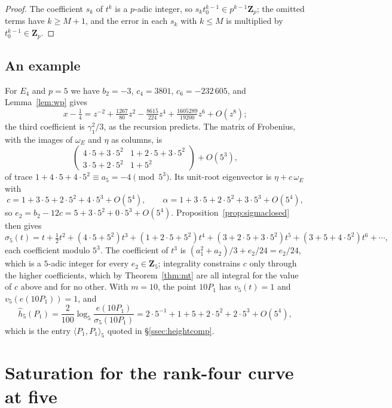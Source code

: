 \documentclass[11pt]{amsart}
\theoremstyle{definition}
\newcommand{\Z}{\mathbf{Z}}
\newcommand{\Zp}{\mathbf{Z}_p}
\begin{document}
\begin{proof}
The coefficient $s_k$ of $t^k$ is a $p$-adic integer, so $s_kt_0^{k-1}\in p^{k-1}\Zp$; the omitted terms have $k\ge M+1$, and the error in each $s_k$ with $k\le M$ is multiplied by $t_0^{k-1}\in\Zp$.
\end{proof}

\subsection{An example}
For $E_4$ and $p=5$ we have $b_2=-3$, $c_4=3801$, $c_6=-232\,605$, and Lemma~\ref{lem:wp} gives
\[
x-\tfrac14=z^{-2}+\tfrac{1267}{80}z^2-\tfrac{8615}{224}z^4+\tfrac{1605289}{19200}z^6+O(z^8);
\]
the third coefficient is $\gamma_1^2/3$, as the recursion predicts. The matrix of Frobenius, with the images of $\omega_E$ and $\eta$ as columns, is
\[
\begin{pmatrix}4\cdot5+3\cdot5^2&1+2\cdot5+3\cdot5^2\\3\cdot5+2\cdot5^2&1+5^2\end{pmatrix}+O(5^3),
\]
of trace $1+4\cdot5+4\cdot5^2\equiv a_5=-4\pmod{5^3}$. Its unit-root eigenvector is $\eta+c\,\omega_E$ with
\[
c=1+3\cdot5+2\cdot5^2+4\cdot5^3+O(5^4),\qquad \alpha=1+3\cdot5+2\cdot5^2+3\cdot5^3+O(5^4),
\]
so $e_2=b_2-12c=5+3\cdot5^2+0\cdot5^3+O(5^4)$. Proposition~\ref{prop:sigmaclosed} then gives
\[
\sigma_5(t)=t+\tfrac12t^2+(4\cdot5+5^2)t^3+(1+2\cdot5+5^2)t^4+(3+2\cdot5+3\cdot5^2)t^5+(3+5+4\cdot5^2)t^6+\cdots,
\]
each coefficient modulo $5^3$. The coefficient of $t^3$ is $(a_1^2+a_2)/3+e_2/24=e_2/24$, which is a $5$-adic integer for every $e_2\in\Z_5$; integrality constrains $c$ only through the higher coefficients, which by Theorem~\ref{thm:mt} are all integral for the value of $c$ above and for no other. With $m=10$, the point $10P_1$ has $v_5(t)=1$ and $v_5(e(10P_1))=1$, and
\[
\hat h_5(P_1)=\frac{2}{100}\log_5\frac{e(10P_1)}{\sigma_5(10P_1)}=2\cdot5^{-1}+1+5+2\cdot5^2+2\cdot5^3+O(5^4),
\]
which is the entry $\langle P_1,P_1\rangle_5$ quoted in \S\ref{ssec:heightcomp}.

\section{Saturation for the rank-four curve at five}\label{app:sat}
\end{document}
